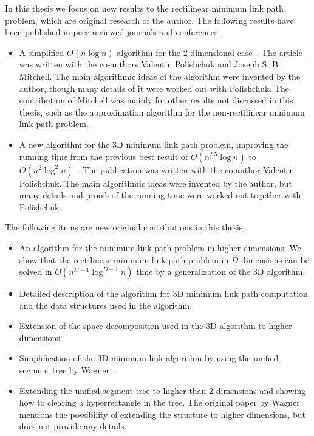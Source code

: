 \documentclass[english,gradu]{tktltiki2018}
\begin{document}
In this thesis we focus on new results to the rectilinear minimum link path problem, which are original research of the author.
The following results have been published in peer-reviewed journals and conferences.
\begin{itemize}
\item A simplified $O(n\log n)$ algorithm for the 2-dimensional case~\cite{revisited}.
The article was written with the co-authors Valentin Polishchuk and Joseph S. B. Mitchell.
The main algorithmic ideas of the algorithm were invented by the author, though many details of it were worked out with Polishchuk.
The contribution of Mitchell was mainly for other results not discussed in this thesis, such as the approximation algorithm for the non-rectilinear minimum link path problem.
\item A new algorithm for the 3D minimum link path problem, improving the running time from the previous best result of $O(n^{2.5}\log n)$ to $O(n^2\log^2 n)$~\cite{restricted}.
The publication was written with the co-author Valentin Polishchuk.
The main algorithmic ideas were invented by the author, but many details and proofs of the running time were worked out together with Polishchuk.
\end{itemize}

The following items are new original contributions in this thesis.

\begin{itemize}
\item An algorithm for the minimum link path problem in higher dimensions.
	We show that the rectilinear minimum link path problem in $D$ dimensions can be solved in $O(n^{D-1}\log^{D-1} n)$ time by a generalization of the 3D algorithm.
\item Detailed description of the algorithm for 3D minimum link path computation and the data structures used in the algorithm.
\item Extension of the space decomposition used in the 3D algorithm to higher dimensions.
\item Simplification of the 3D minimum link algorithm by using the unified segment tree by Wagner~\cite{unified}.
\item Extending the unified segment tree to higher than 2 dimensions and showing how to clearing a hyperrectangle in the tree.
	The original paper by Wagner~\cite{unified} mentions the possibility of extending the structure to higher dimensions, but does not provide any details.
\end{itemize}
\end{document}
